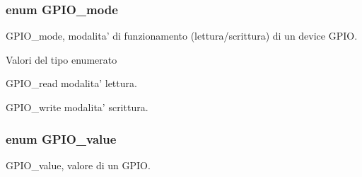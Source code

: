\hypertarget{group___g_p_i_o_ga894e6ae857ed4a9aedd04fff44a6770e}{
\subsubsection[{G\+P\+I\+O\+\_\+mode}]{\setlength{\rightskip}{0pt plus 5cm}enum {\bf G\+P\+I\+O\+\_\+mode}}}\label{group___g_p_i_o_ga894e6ae857ed4a9aedd04fff44a6770e}


G\+P\+I\+O\+\_\+mode, modalita' di funzionamento (lettura/scrittura) di un device G\+P\+I\+O. 

\begin{Desc}
\item[Valori del tipo enumerato]\par
\begin{description}
\item[{\em 
\hypertarget{group___g_p_i_o_gga894e6ae857ed4a9aedd04fff44a6770ea3db3c7d228d9b87cc125c8974241c800}{G\+P\+I\+O\+\_\+read}\label{group___g_p_i_o_gga894e6ae857ed4a9aedd04fff44a6770ea3db3c7d228d9b87cc125c8974241c800}
}]G\+P\+I\+O\+\_\+read modalita' lettura. \item[{\em 
\hypertarget{group___g_p_i_o_gga894e6ae857ed4a9aedd04fff44a6770eab1b932c1d800b09eb45b7ff5750bf73c}{G\+P\+I\+O\+\_\+write}\label{group___g_p_i_o_gga894e6ae857ed4a9aedd04fff44a6770eab1b932c1d800b09eb45b7ff5750bf73c}
}]G\+P\+I\+O\+\_\+write modalita' scrittura. \end{description}
\end{Desc}
\hypertarget{group___g_p_i_o_ga495d9a7aa735fe416a3f110337c54967}{
\subsubsection[{G\+P\+I\+O\+\_\+value}]{\setlength{\rightskip}{0pt plus 5cm}enum {\bf G\+P\+I\+O\+\_\+value}}}\label{group___g_p_i_o_ga495d9a7aa735fe416a3f110337c54967}


G\+P\+I\+O\+\_\+value, valore di un G\+P\+I\+O. 


